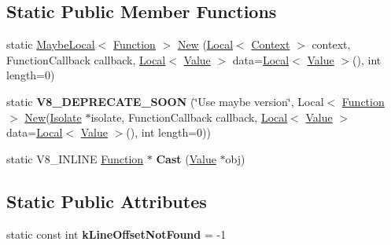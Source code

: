 \subsection*{Static Public Member Functions}
\begin{DoxyCompactItemize}
\item 
static \hyperlink{classv8_1_1_maybe_local}{Maybe\+Local}$<$ \hyperlink{classv8_1_1_function}{Function} $>$ \hyperlink{classv8_1_1_function_a74b0edad0cc88a69593db0c5ae63b454}{New} (\hyperlink{classv8_1_1_local}{Local}$<$ \hyperlink{classv8_1_1_context}{Context} $>$ context, Function\+Callback callback, \hyperlink{classv8_1_1_local}{Local}$<$ \hyperlink{classv8_1_1_value}{Value} $>$ data=\hyperlink{classv8_1_1_local}{Local}$<$ \hyperlink{classv8_1_1_value}{Value} $>$(), int length=0)
\item 
static {\bfseries V8\+\_\+\+D\+E\+P\+R\+E\+C\+A\+T\+E\+\_\+\+S\+O\+ON} (\char`\"{}Use maybe version\char`\"{}, Local$<$ \hyperlink{classv8_1_1_function}{Function} $>$ \hyperlink{classv8_1_1_function_a74b0edad0cc88a69593db0c5ae63b454}{New}(\hyperlink{classv8_1_1_isolate}{Isolate} $\ast$isolate, Function\+Callback callback,                                                                                               \hyperlink{classv8_1_1_local}{Local}$<$ \hyperlink{classv8_1_1_value}{Value} $>$ data=\hyperlink{classv8_1_1_local}{Local}$<$ \hyperlink{classv8_1_1_value}{Value} $>$(), int length=0))\hypertarget{classv8_1_1_function_ac6281ad77b5f3ab414b7fd315471326d}{}\label{classv8_1_1_function_ac6281ad77b5f3ab414b7fd315471326d}

\item 
static V8\+\_\+\+I\+N\+L\+I\+NE \hyperlink{classv8_1_1_function}{Function} $\ast$ {\bfseries Cast} (\hyperlink{classv8_1_1_value}{Value} $\ast$obj)\hypertarget{classv8_1_1_function_af24f38bcc0769519816cda1f6a154ff8}{}\label{classv8_1_1_function_af24f38bcc0769519816cda1f6a154ff8}

\end{DoxyCompactItemize}
\subsection*{Static Public Attributes}
\begin{DoxyCompactItemize}
\item 
static const int {\bfseries k\+Line\+Offset\+Not\+Found} = -\/1\hypertarget{classv8_1_1_function_acf0af24f79908e405a6ac435277596d9}{}\label{classv8_1_1_function_acf0af24f79908e405a6ac435277596d9}

\end{DoxyCompactItemize}
